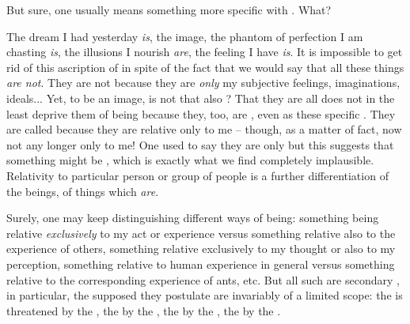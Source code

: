 \pa\label{pa:keepDistinguish}
But sure, one usually means something more specific with . What?

The dream I had yesterday {\em is}, the image, the phantom of perfection I am
chasting {\em is}, the illusions I nourish {\em are}, the feeling I have {\em
  is}.  It is impossible to get rid of this ascription of  in spite
of the fact that we would say that all these things {\em are not}. They are not
because they are {\em only} my subjective feelings, imaginations, ideals... Yet, to be an
image, is not that also ?  That they are all  does
not in the least deprive them of being because they, too, are
, even  as these specific .  They
are called  because they are relative only to me -- though, as a
matter of fact, now not any longer only to me! One used to say they are only
 but this suggests that something might be ,  which is exactly what we find completely implausible.  Relativity to
particular person or group of people is a further differentiation of the
 beings, of things which {\em are}.

Surely, one may keep distinguishing different ways of being: something being
relative {\em exclusively} to my act or experience versus something relative
also to the experience of others, something relative exclusively to my thought
or also to my perception, something relative to human experience in general
versus something relative to the corresponding experience of ants, etc. But all
such are secondary , in particular, the supposed
 they postulate are invariably of a limited scope: the
 is threatened by the , the  by the , the
 by the , the  by the .

